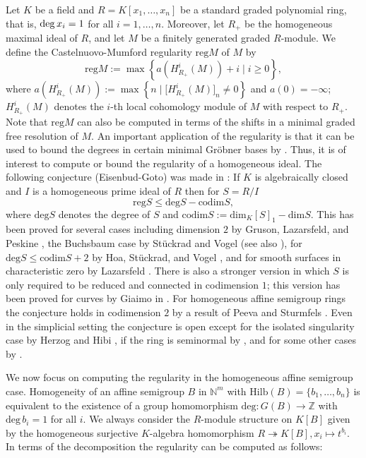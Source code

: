 \documentclass[11pt,a4paper]{amsart}%
\theoremstyle{definition}
\theoremstyle{remark}
\numberwithin{equation}{section}
\theoremstyle{plain}
\newcommand{\de}{{\rm deg}\,}
\begin{document}
Let $K$ be a field and $R=K[x_{1},\ldots,x_{n}]$ be a standard graded
polynomial ring, that is, \mbox{$\de x_i=1$} for all $i=1,\ldots,n$. Moreover,
let $R_{+}$ be the homogeneous maximal ideal of $R$, and let $M$ be a finitely
generated graded $R$-module. We define the Castelnuovo-Mumford regularity
$\mathrm{reg}M$ of $M$ by
\[
\mathrm{reg}M:=\max\left\{  a(H_{R_{+}}^{i}(M))+i\mid i\geq0\right\}  ,
\]
where $a(H_{R_{+}}^{i}(M)):=\max\left\{  n\mid\lbrack H_{R_{+}}^{i}%
(M)]_{n}\not =0\right\}  $ and $a(0)=-\infty$; $H_{R_{+}}^{i}(M)$ denotes the
$i$-th local cohomology module of $M$ with respect to $R_{+}$. Note that
$\mathrm{reg}M$ can also be computed in terms of the shifts in a minimal
graded free resolution of $M$. An important application of the regularity is
that it can be used to bound the degrees in certain minimal Gr\"{o}bner bases
by \cite{BSCDM}. Thus, it is of interest to compute or bound the regularity of
a homogeneous ideal. The following conjecture (Eisenbud-Goto) was made in
\cite{EG}: If $K$ is algebraically closed and $I$ is a homogeneous prime ideal
of $R$ then for $S=R/I$%
\[
\mathrm{reg}S\leq\mathrm{deg}S-\mathrm{codim}S,
\]
where $\mathrm{deg}S$ denotes the degree of $S$ and $\mathrm{codim}%
S:=\mathrm{dim}_{K}\left[  S\right]  _{1}-\mathrm{dim}S$. This has been proved
for several cases including dimension $2$ by Gruson, Lazarsfeld, and Peskine
\cite{GLP}, the Buchsbaum case by St\"{u}ckrad and Vogel \cite{EGBB} (see also
\cite{EGCM}), for $\mathrm{deg}S\leq\mathrm{codim}S+2$ by Hoa, St\"{u}ckrad,
and Vogel \cite{HSVC2}, and for smooth surfaces in characteristic zero by
Lazarsfeld \cite{LSMSD3}. There is also a stronger version in which $S$ is
only required to be reduced and connected in codimension $1$; this version has
been proved for curves by Giaimo in \cite{DGEGCC}. For homogeneous affine
semigroup rings the conjecture holds in codimension $2$ by a result of Peeva
and Sturmfels \cite{codim2}. Even in the simplicial setting the conjecture is
open except for the isolated singularity case by Herzog and Hibi \cite{CMHH},
if the ring is seminormal by \cite{MNSN}, and for some other cases by
\cite{HSCM, MNEGMC}.\newline

We now focus on computing the regularity in the homogeneous affine semigroup
case. Homogeneity of an affine semigroup $B$ in $\mathbb{N}^{m}$ with
$\mathrm{Hilb}(B)=\{b_{1},\ldots,b_{n}\}$ is equivalent to the existence of a
group homomorphism $\mathrm{deg}: G(B)\rightarrow\mathbb{Z}$ with
$\mathrm{deg}\, b_{i}=1$ for all $i$. We always consider the $R$-module
structure on $K[B]$ given by the homogeneous surjective $K$-algebra
homomorphism $R\twoheadrightarrow K[B], x_{i}\mapsto t^{b_{i}}$. In terms of
the decomposition the regularity can be computed as follows:
\end{document}
